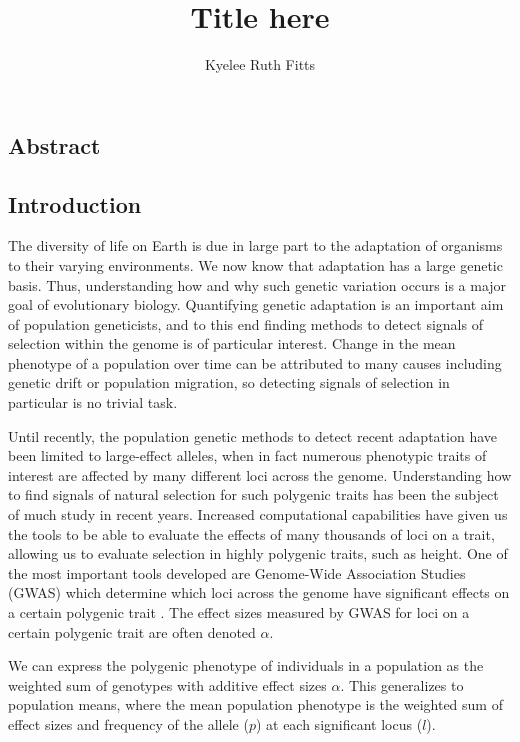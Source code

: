 \documentclass[a4paper,12pt]{article}
\begin{document}
\title{\vspace{-2cm}
  Title here
}
\author{Kyelee Ruth Fitts}
\maketitle


\subsection*{Abstract}

\subsection*{Introduction}

The diversity of life on Earth is due in large part to the
adaptation of organisms to their varying environments. We now know that
adaptation has a large genetic basis. Thus, understanding how and why such
genetic variation occurs is a major goal of evolutionary
biology. Quantifying genetic adaptation is an important aim of population
geneticists, and to this end finding methods to detect signals of
selection within the genome is of particular interest. Change in the
mean phenotype of a population over time can be attributed to many causes including genetic
drift or population migration, so detecting signals of selection in
particular is no trivial task.

Until recently, the population genetic methods to detect recent adaptation have been limited to
large-effect alleles, when in fact numerous phenotypic traits of interest
are affected by many different loci across the genome. Understanding
how to find signals of natural selection for such polygenic traits has been
the subject of much study in recent years. Increased computational
capabilities have given us the tools to be able to evaluate the effects
of many thousands of loci on a trait, allowing us to evaluate
selection in highly polygenic traits, such as height. One of the most
important tools developed are Genome-Wide Association Studies (GWAS)
which determine which loci across the genome have significant effects
on a certain polygenic trait \cite{gwasoverview}. The effect sizes
measured by GWAS for loci on a certain polygenic trait are often
denoted $\alpha$.

We can express the polygenic phenotype of individuals in a population
as the weighted sum of genotypes with additive effect sizes
$\alpha$. This generalizes to population means, where the mean
population phenotype is the weighted sum of effect sizes and frequency
of the allele ($p$) at each significant locus ($l$). \cite{gillespie}
\end{document}
